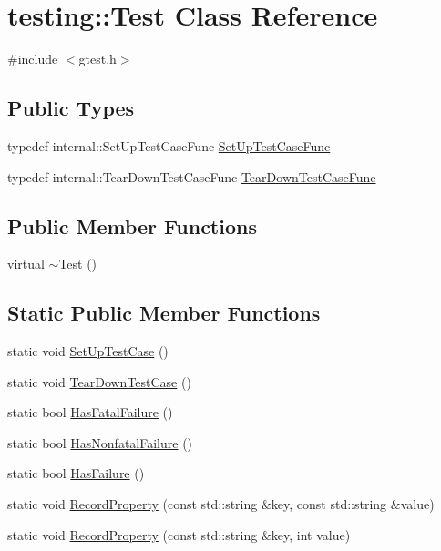 \hypertarget{classtesting_1_1_test}{}\section{testing\+::Test Class Reference}
\label{classtesting_1_1_test}


{\ttfamily \#include $<$gtest.\+h$>$}

\subsection*{Public Types}
\begin{DoxyCompactItemize}
\item 
typedef internal\+::\+Set\+Up\+Test\+Case\+Func \mbox{\hyperlink{classtesting_1_1_test_a5f2a051d1d99c9b784c666c586186cf9}{Set\+Up\+Test\+Case\+Func}}
\item 
typedef internal\+::\+Tear\+Down\+Test\+Case\+Func \mbox{\hyperlink{classtesting_1_1_test_aa0f532e93b9f3500144c53f31466976c}{Tear\+Down\+Test\+Case\+Func}}
\end{DoxyCompactItemize}
\subsection*{Public Member Functions}
\begin{DoxyCompactItemize}
\item 
virtual \mbox{\hyperlink{classtesting_1_1_test_ad99dc9b12208fd4bffc367f0a1e3df1b}{$\sim$\+Test}} ()
\end{DoxyCompactItemize}
\subsection*{Static Public Member Functions}
\begin{DoxyCompactItemize}
\item 
static void \mbox{\hyperlink{classtesting_1_1_test_a5ccbac42fee8c5b00b0bfe89b6c49d79}{Set\+Up\+Test\+Case}} ()
\item 
static void \mbox{\hyperlink{classtesting_1_1_test_af374706cbaf0ffc460f4fd04e7c150f1}{Tear\+Down\+Test\+Case}} ()
\item 
static bool \mbox{\hyperlink{classtesting_1_1_test_a0a89846458f0e8ed1c9457c957e8182a}{Has\+Fatal\+Failure}} ()
\item 
static bool \mbox{\hyperlink{classtesting_1_1_test_a07e896f1b1836f8ac075c26d7b7c9fb8}{Has\+Nonfatal\+Failure}} ()
\item 
static bool \mbox{\hyperlink{classtesting_1_1_test_a7a00be7dd0a6bfdc8d47a1b784623613}{Has\+Failure}} ()
\item 
static void \mbox{\hyperlink{classtesting_1_1_test_ae0448aec9e389fab70f6a75a59ff6aa2}{Record\+Property}} (const std\+::string \&key, const std\+::string \&value)
\item 
static void \mbox{\hyperlink{classtesting_1_1_test_af602903efb17730b977304fc56500881}{Record\+Property}} (const std\+::string \&key, int value)
\end{DoxyCompactItemize}
